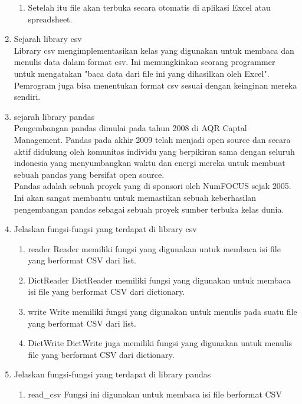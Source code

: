 \documentclass[a4paper, 12pt]{article}
\begin{document}
\begin{enumerate}
\begin{enumerate}
\item Setelah itu file akan terbuka secara otomatis di aplikasi Excel atau spreadsheet.
\end{enumerate} 
\item Sejarah library csv
\\
Library csv mengimplementasikan kelas yang digunakan untuk membaca dan menulis data dalam format csv. Ini memungkinkan seorang programmer untuk mengatakan "baca data dari file ini yang dihasilkan oleh Excel". Pemrogram juga bisa menentukan format csv sesuai dengan keinginan mereka sendiri.
\item sejarah library pandas
\\
Pengembangan pandas dimulai pada tahun 2008 di AQR Captal Management. Pandas pada akhir 2009 telah menjadi open source dan secara aktif didukung oleh komunitas individu yang berpikiran sama dengan seluruh indonesia yang menyumbangkan waktu dan energi mereka untuk membuat sebuah pandas yang bersifat open source. 
\\
Pandas adalah sebuah proyek yang di sponsori oleh NumFOCUS sejak 2005. Ini akan sangat membantu untuk memastikan sebuah keberhasilan pengembangan pandas sebagai sebuah proyek sumber terbuka kelas dunia.
\item Jelaskan fungsi-fungsi yang terdapat di library csv
\begin{enumerate}
\item reader
\hfill\break
	Reader memiliki fungsi yang digunakan untuk membaca isi file yang berformat CSV dari list.
    
\item DictReader
\hfill\break
	DictReader memiliki fungsi yang digunakan untuk membaca isi file yang berformat CSV dari dictionary.
	
\item write
\hfill\break
	Write memiliki fungsi yang digunakan untuk menulis pada suatu file yang berformat CSV dari list.
	
\item DictWrite
\hfill\break
	DictWrite juga memiliki fungsi yang digunakan untuk menulis file yang berformat CSV dari dictionary.

\end{enumerate}
\item Jelaskan fungsi-fungsi yang terdapat di library pandas
\begin{enumerate}
\item read\_csv
\hfill\break
	Fungsi ini digunakan untuk membaca isi file berformat CSV


\end{enumerate}
\end{enumerate}
\end{document}
